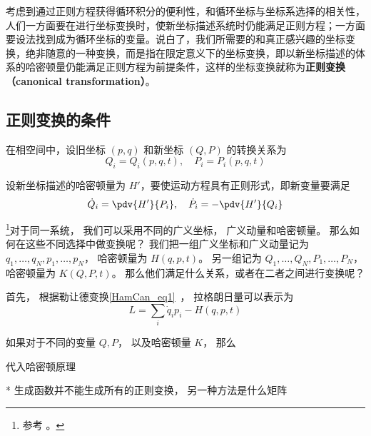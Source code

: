 考虑到通过正则方程获得循环积分的便利性，和循环坐标与坐标系选择的相关性，人们一方面要在进行坐标变换时，使新坐标描述系统时仍能满足正则方程；一方面要设法找到成为循环坐标的变量。说白了，我们所需要的和真正感兴趣的坐标变换，绝非随意的一种变换，而是指在限定意义下的坐标变换，即以新坐标描述的体系的哈密顿量仍能满足正则方程为前提条件，这样的坐标变换就称为\textbf{正则变换（canonical transformation）}。

\subsection{正则变换的条件}
在相空间中，设旧坐标 $(p,q)$ 和新坐标 $(Q,P)$ 的转换关系为
\begin{equation}
Q_i=Q_i(p,q,t),\quad P_i=P_i(p,q,t)
\end{equation}

设新坐标描述的哈密顿量为 $H'$，要使运动方程具有正则形式，即新变量要满足
\begin{equation}
\dot Q_i=\pdv{H'}{P_i},\quad \dot P_i=-\pdv{H'}{Q_i}
\end{equation}



\footnote{参考 \cite{Goldstein}。}对于同一系统， 我们可以采用不同的广义坐标， 广义动量和哈密顿量。 那么如何在这些不同选择中做变换呢？ 我们把一组广义坐标和广义动量记为 $q_1,\dots, q_N, p_1, \dots, p_N$， 哈密顿量为 $H(q, p, t)$。 另一组记为 $Q_1,\dots, Q_N, P_1, \dots, P_N$， 哈密顿量为 $K(Q, P, t)$。 那么他们满足什么关系，或者在二者之间进行变换呢？

首先， 根据勒让德变换\autoref{HamCan_eq1}~， 拉格朗日量可以表示为
\begin{equation}
L = \sum_i \dot q_i p_i - H(q, p, t)
\end{equation}

如果对于不同的变量 $Q, P$， 以及哈密顿量 $K$， 那么

代入哈密顿原理

* 生成函数并不能生成所有的正则变换， 另一种方法是什么矩阵
